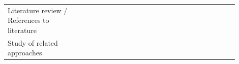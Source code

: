 \documentclass[english, 12pt, a4paper, sci, utf8, a-1b, online]{aaltothesis}
\begin{document}
\begin{center}
\begin{longtable}{p{0.3\linewidth}p{0.6\linewidth}}
    Literature review / References to literature & \textcite{fagerholm-dx-concept-and-definition} \newline \textcite{henriques2018improving} \newline \textcite{fontao2017investigating} \newline \textcite{chatley2019supporting} \newline \textcite{pinter2019polymorph} \newline \textcite{entering-an-ecosystem} \newline \textcite{fagerholm2014examining} \newline \textcite{fontao2016mseco} \newline \textcite{fontao2015research} \newline \textcite{myers2016improving} \newline \textcite{ekwoge2017tester} \newline \textcite{romano2018effect} \newline \textcite{open-service-innovation} \newline \textcite{de2017towards} \newline \textcite{programmer-experience} \newline \textcite{oran2017set}                                                                                                                                                                                                                                                                                   \\
    Study of related approaches                  & \textcite{fagerholm-dx-concept-and-definition} \newline \textcite{henriques2018improving}                                                                                                                                                                                                                                                                                                                                                                                                                                                                                                                                                                                                                                                                                                                                                                                                                                                          \\

\end{longtable}
\end{center}
\end{document}

